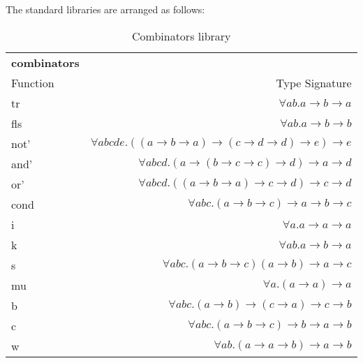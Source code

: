 The standard libraries are arranged as follows:

\begin{table}[H]
    \begin{tabular}{l r}
    \rowcolor{light-gray}
        \textbf{combinators} & \\
        Function & Type Signature \\
        \hline
        tr & $\forall a b. a \rightarrow b \rightarrow a$ \\
        fls & $\forall a b. a \rightarrow b \rightarrow b$ \\
        not' & $\forall a b c d e. ((a \rightarrow b \rightarrow a) \rightarrow (c \rightarrow d \rightarrow d) \rightarrow e) \rightarrow e$ \\
        and' & $\forall a b c d. (a \rightarrow (b \rightarrow c \rightarrow c) \rightarrow d) \rightarrow a \rightarrow d$ \\
        or' & $\forall a b c d. ((a \rightarrow b \rightarrow a) \rightarrow c \rightarrow d) \rightarrow c \rightarrow d$ \\
        cond & $\forall a b c. (a \rightarrow b \rightarrow c) \rightarrow a \rightarrow b \rightarrow c$ \\
        i & $\forall a. a \rightarrow a \rightarrow a$ \\
        k & $\forall a b. a \rightarrow b \rightarrow a$ \\
        s & $\forall a b c. (a \rightarrow b \rightarrow c) (a \rightarrow b) \rightarrow a \rightarrow c$ \\
        mu & $\forall a. (a \rightarrow a) \rightarrow a$ \\
        b & $\forall a b c. (a \rightarrow b) \rightarrow (c \rightarrow a) \rightarrow c \rightarrow b$\\
        c & $\forall a b c. (a \rightarrow b \rightarrow c) \rightarrow b \rightarrow a \rightarrow b$ \\
        w & $\forall a b. (a \rightarrow a \rightarrow b) \rightarrow a \rightarrow b$ \\
    \end{tabular}
    \caption{Combinators library}
\label{table:combinators}
\end{table}

